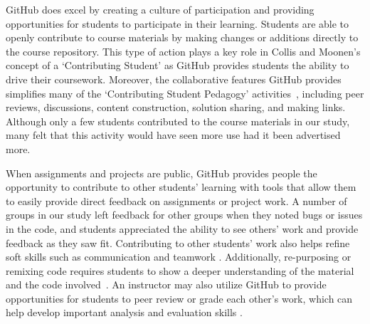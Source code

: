 GitHub does excel by creating a culture of participation \cite{jenkins2009confronting} and providing opportunities for students to participate in their learning. Students are able to openly contribute to course materials by making changes or additions directly to the course repository. This type of action plays a key role in Collis and Moonen's concept of a `Contributing Student' \cite{collis2006contributing} as GitHub provides students the ability to drive their coursework. Moreover, the collaborative features GitHub provides simplifies many of the `Contributing Student Pedagogy' activities~\cite{hamer2011tools}, including peer reviews, discussions, content construction, solution sharing, and making links. Although only a few students contributed to the course materials in our study, many felt that this activity would have seen more use had it been advertised more.

When assignments and projects are public, GitHub provides people the opportunity to contribute to other students' learning with tools that allow them to easily provide direct feedback on assignments or project work. A number of groups in our study left feedback for other groups when they noted bugs or issues in the code, and students appreciated the ability to see others' work and provide feedback as they saw fit. Contributing to other students' work also helps refine soft skills such as communication and teamwork \cite{hamer2006some}. Additionally, re-purposing or remixing code requires students to show a deeper understanding of the material and the code involved~\cite{sant2015code}. An instructor may also utilize GitHub to provide opportunities for students to peer review or grade each other's work, which can help develop important analysis and evaluation skills \cite{sondergaard2012collaborative}.


